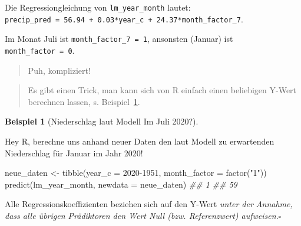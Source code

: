 \documentclass[
  letterpaper,
]{scrbook}
\newenvironment{Shaded}{\begin{snugshade}}{\end{snugshade}}
\newcommand{\AttributeTok}[1]{\textcolor[rgb]{0.40,0.45,0.13}{#1}}
\newcommand{\DecValTok}[1]{\textcolor[rgb]{0.68,0.00,0.00}{#1}}
\newcommand{\DocumentationTok}[1]{\textcolor[rgb]{0.37,0.37,0.37}{\textit{#1}}}
\newcommand{\FunctionTok}[1]{\textcolor[rgb]{0.28,0.35,0.67}{#1}}
\newcommand{\NormalTok}[1]{\textcolor[rgb]{0.00,0.23,0.31}{#1}}
\newcommand{\OtherTok}[1]{\textcolor[rgb]{0.00,0.23,0.31}{#1}}
\newcommand{\StringTok}[1]{\textcolor[rgb]{0.13,0.47,0.30}{#1}}
\theoremstyle{definition}
\newtheorem{example}{Beispiel}[chapter]
\theoremstyle{definition}
\theoremstyle{definition}
\theoremstyle{remark}
\begin{document}
Die Regressiongleichung von \texttt{lm\_year\_month} lautet:
\texttt{precip\_pred\ =\ 56.94\ +\ 0.03*year\_c\ +\ 24.37*month\_factor\_7}.

Im Monat Juli ist \texttt{month\_factor\_7\ =\ 1}, ansonsten (Januar)
ist \texttt{month\_factor\ =\ 0}.

\begin{quote}
{} Puh, kompliziert!
\end{quote}

\begin{quote}
{} Es gibt einen Trick, man kann sich von R einfach einen
beliebigen Y-Wert berechnen lassen, s. Beispiel~\ref{exm-niederschlag1}.
\end{quote}

\begin{example}[Niederschlag laut Modell Im Juli
2020?]\protect\hypertarget{exm-niederschlag1}{}\label{exm-niederschlag1}

Hey R, berechne uns anhand neuer Daten den laut Modell zu erwartenden
Niederschlag für Januar im Jahr 2020!

\begin{Shaded}
\begin{Highlighting}[]
\NormalTok{neue\_daten }\OtherTok{\textless{}{-}} \FunctionTok{tibble}\NormalTok{(}\AttributeTok{year\_c =} \DecValTok{2020{-}1951}\NormalTok{,}
                     \AttributeTok{month\_factor =} \FunctionTok{factor}\NormalTok{(}\StringTok{"1"}\NormalTok{))}
\FunctionTok{predict}\NormalTok{(lm\_year\_month, }\AttributeTok{newdata =}\NormalTok{ neue\_daten)}
\DocumentationTok{\#\#  1 }
\DocumentationTok{\#\# 59}
\end{Highlighting}
\end{Shaded}

\end{example}

\begin{tcolorbox}[enhanced jigsaw, left=2mm, toptitle=1mm, toprule=.15mm, rightrule=.15mm, leftrule=.75mm, breakable, colbacktitle=quarto-callout-note-color!10!white, colback=white, coltitle=black, bottomtitle=1mm, opacityback=0, title=\textcolor{quarto-callout-note-color}{\faInfo}\hspace{0.5em}{Hinweis}, colframe=quarto-callout-note-color-frame, arc=.35mm, opacitybacktitle=0.6, bottomrule=.15mm, titlerule=0mm]

Alle Regressionskoeffizienten beziehen sich auf den Y-Wert \emph{unter
der Annahme, dass alle übrigen Prädiktoren den Wert Null (bzw.
Referenzwert) aufweisen}.\(\square\)

\end{tcolorbox}
\end{document}
